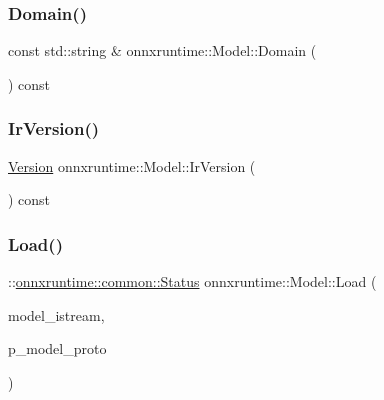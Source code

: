 \subsubsection{\texorpdfstring{Domain()}{Domain()}}
{\footnotesize\ttfamily const std\+::string \& onnxruntime\+::\+Model\+::\+Domain (\begin{DoxyParamCaption}{ }\end{DoxyParamCaption}) const}

\mbox{\label{classonnxruntime_1_1Model_a6a7bb4216f04ffd4fec8b43129d304d4}} 
\subsubsection{\texorpdfstring{Ir\+Version()}{IrVersion()}}
{\footnotesize\ttfamily \mbox{\hyperlink{namespaceonnxruntime_ab7fae8d5830807c074def3bb8ae23cf1}{Version}} onnxruntime\+::\+Model\+::\+Ir\+Version (\begin{DoxyParamCaption}{ }\end{DoxyParamCaption}) const}

\mbox{\label{classonnxruntime_1_1Model_aee6c392788aa2baf2086f03032b21a3b}} 
\subsubsection{\texorpdfstring{Load()}{Load()}\hspace{0.1cm}{\footnotesize\ttfamily [1/5]}}
{\footnotesize\ttfamily \+::\mbox{\hyperlink{classonnxruntime_1_1common_1_1Status}{onnxruntime\+::common\+::\+Status}} onnxruntime\+::\+Model\+::\+Load (\begin{DoxyParamCaption}\item[{std\+::istream \&}]{model\+\_\+istream,  }\item[{O\+N\+N\+X\+\_\+\+N\+A\+M\+E\+S\+P\+A\+C\+E\+::\+Model\+Proto $\ast$}]{p\+\_\+model\+\_\+proto }\end{DoxyParamCaption})\hspace{0.3cm}{\ttfamily [static]}}

\mbox{\label{classonnxruntime_1_1Model_a629f04ffae1930227a4dbe3591ff2f98}} 
